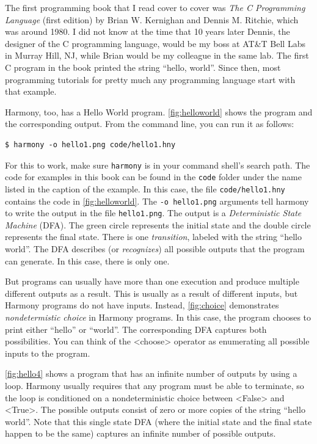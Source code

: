 \documentclass{report}
\newenvironment{code}{
\tcolorbox
}{
\endtcolorbox
}
\begin{document}
The first programming book that I read cover to cover was \emph{The C Programming
Language} (first edition) by Brian W. Kernighan and Dennis M. Ritchie, which
was around 1980.  I did not know at the time that 10 years later Dennis,
the designer of the C programming language, would be my boss at AT\&T Bell Labs
in Murray Hill, NJ, while Brian would be my colleague in the same lab.
The first C program in the book printed
the string ``hello, world''.  Since then, most programming tutorials for
pretty much any programming language start with that example.

Harmony, too, has a Hello World program.
\autoref{fig:helloworld} shows the program and the corresponding output.
From the command line, you can run it as follows:
\begin{code}
\begin{verbatim}
$ harmony -o hello1.png code/hello1.hny
\end{verbatim}
\end{code}
For this to work, make sure \texttt{harmony} is in your command shell's
search path.
The code for examples in this book can be found in the \texttt{code}
folder under the name listed in the caption of the example.
In this case, the file \texttt{code/hello1.hny} contains the
code in \autoref{fig:helloworld}.
The \texttt{-o hello1.png} arguments tell harmony to write the output
in the file \texttt{hello1.png}.
The output is a \emph{Deterministic State Machine} (DFA).  The green circle
represents the initial state and the double circle represents the final
state.  There is one \emph{transition}, labeled with the string
``hello world''.  The DFA describes (or \emph{recognizes}) all possible
outputs that the program can generate.  In this case, there is only one.

%
But programs can usually have more than one execution and produce multiple
different outputs as a result.  This is usually as a result of different
inputs, but Harmony programs do not have inputs. Instead,
\autoref{fig:choice} demonstrates
\emph{nondetermistic choice} in Harmony programs.  In this case, the
program chooses to print either ``hello'' or ``world''.  The corresponding
DFA captures both possibilities.
You can think of the <{choose}> operator as enumerating all possible
inputs to the program.

\autoref{fig:hello4} shows a program that has an infinite number of outputs
by using a loop.  Harmony usually requires that any program must be able
to terminate, so the loop is conditioned on a nondeterministic choice between
<{False}> and <{True}>.  The possible outputs consist of zero or
more copies of the string ``hello world''.  Note that this single state DFA
(where the initial state and the final state happen to be the same)
captures an infinite number of possible outputs.
\end{document}
